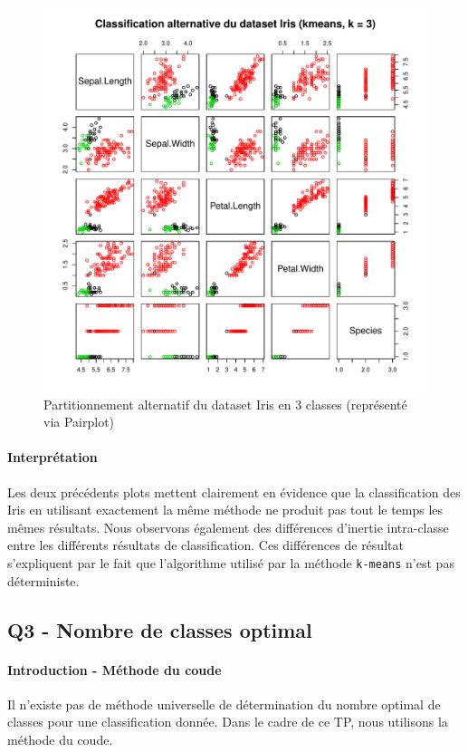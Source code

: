 \documentclass{report}
\begin{document}
\begin{figure}[ht!]
\begin{center}
    \includegraphics[width=\textwidth]{../plots/E3Q2_altCLUSi_2.pdf}
    \caption{Partitionnement alternatif du dataset Iris en 3 classes (représenté via Pairplot)}
\end{center}
\end{figure}
\newpage
\paragraph{Interprétation}
Les deux précédents plots mettent clairement en évidence que la classification des Iris en utilisant exactement la même méthode ne produit pas tout le temps les mêmes résultats. Nous observons également des différences d'inertie intra-classe entre les différents résultats de classification. Ces différences de résultat s'expliquent par le fait que l'algorithme utilisé par la méthode \verb+k-means+ n'est pas déterministe.
\newpage
\subsection{Q3 - Nombre de classes optimal}
\paragraph{Introduction - Méthode du coude}
Il n'existe pas de méthode universelle de détermination du nombre optimal de classes pour une classification donnée. Dans le cadre de ce TP, nous utilisons la méthode du coude.
\end{document}
